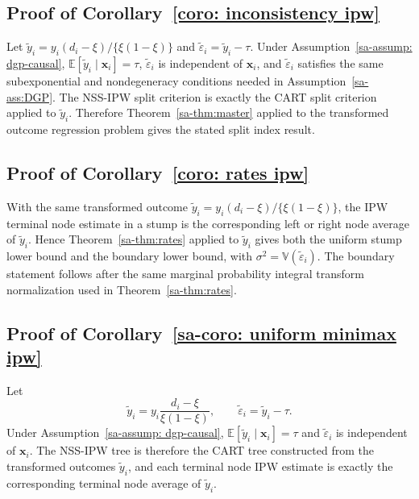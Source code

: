 \documentclass[10pt]{article}
\def\bx{\mathbf{x}}
\def\E{\mathbb{E}}
\def\V{\mathbb{V}}
\theoremstyle{definition}
\theoremstyle{remark}
\begin{document}
\subsection{Proof of Corollary~\ref{coro: inconsistency ipw}}
Let $\tilde y_i=y_i(d_i-\xi)/\{\xi(1-\xi)\}$ and $\tilde\varepsilon_i=\tilde y_i-\tau$. Under Assumption~\ref{sa-assump: dgp-causal}, $\E[\tilde y_i\mid\bx_i]=\tau$, $\tilde\varepsilon_i$ is independent of $\bx_i$, and $\tilde\varepsilon_i$ satisfies the same subexponential and nondegeneracy conditions needed in Assumption~\ref{sa-ass:DGP}. The NSS-IPW split criterion is exactly the CART split criterion applied to $\tilde y_i$. Therefore Theorem~\ref{sa-thm:master} applied to the transformed outcome regression problem gives the stated split index result.


\subsection{Proof of Corollary~\ref{coro: rates ipw}}
With the same transformed outcome $\tilde y_i=y_i(d_i-\xi)/\{\xi(1-\xi)\}$, the IPW terminal node estimate in a stump is the corresponding left or right node average of $\tilde y_i$. Hence Theorem~\ref{sa-thm:rates} applied to $\tilde y_i$ gives both the uniform stump lower bound and the boundary lower bound, with $\sigma^2=\V(\tilde\varepsilon_i)$. The boundary statement follows after the same marginal probability integral transform normalization used in Theorem~\ref{sa-thm:rates}.

\subsection{Proof of Corollary~\ref{sa-coro: uniform minimax ipw}}

Let
\[
    \tilde y_i = y_i\frac{d_i-\xi}{\xi(1-\xi)},
    \qquad
    \tilde\varepsilon_i = \tilde y_i-\tau .
\]
Under Assumption~\ref{sa-assump: dgp-causal}, $\E[\tilde y_i\mid \bx_i]=\tau$ and $\tilde\varepsilon_i$ is independent of $\bx_i$. The NSS-IPW tree is therefore the CART tree constructed from the transformed outcomes $\tilde y_i$, and each terminal node IPW estimate is exactly the corresponding terminal node average of $\tilde y_i$.
\end{document}
